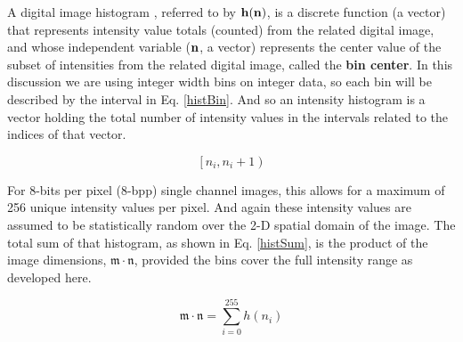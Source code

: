 %
%
%
%
%
%
%
%
%

%
%
%



A digital image histogram \cite{Gonzalez2008}, referred to by $\bf{h}(\bf{n})$, is a discrete function (a vector) that represents intensity value totals (counted) from the related digital image, and whose independent variable ($\bf{n}$, a vector) represents the center value of the subset of intensities from the related digital image, called the \textbf{bin center}. In this discussion we are using integer width bins on integer data, so each bin will be described by the interval in Eq. \ref{histBin}. And so an intensity histogram is a vector holding the total number of intensity values in the intervals related to the indices of that vector. 

\begin{equation}
\label{histBin}
\left[n_{i},n_{i}+1\right)
\end{equation}

For 8-bits per pixel (8-bpp) single channel images, this allows for a maximum of 256 unique intensity values per pixel. And again these intensity values are assumed to be statistically random over the 2-D spatial domain of the image. The total sum of that histogram, as shown in Eq. \ref{histSum}, is the product of the image dimensions, $\mathfrak{m} \cdot \mathfrak{n}$, provided the bins cover the full intensity range as developed here.

\begin{equation}
\label{histSum}
	\mathfrak{m} \cdot \mathfrak{n} = \sum_{i=0}^{255}{h(n_{i})}
\end{equation}

